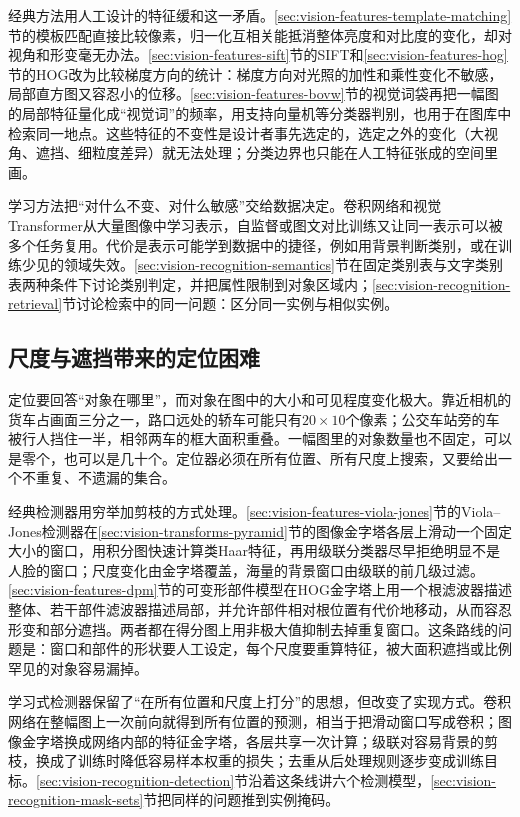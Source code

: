 经典方法用人工设计的特征缓和这一矛盾。\ref{sec:vision-features-template-matching}节的模板匹配直接比较像素，归一化互相关能抵消整体亮度和对比度的变化，却对视角和形变毫无办法。\ref{sec:vision-features-sift}节的SIFT和\ref{sec:vision-features-hog}节的HOG改为比较梯度方向的统计：梯度方向对光照的加性和乘性变化不敏感，局部直方图又容忍小的位移。\ref{sec:vision-features-bovw}节的视觉词袋再把一幅图的局部特征量化成“视觉词”的频率，用支持向量机等分类器判别，也用于在图库中检索同一地点。这些特征的不变性是设计者事先选定的，选定之外的变化（大视角、遮挡、细粒度差异）就无法处理；分类边界也只能在人工特征张成的空间里画。

学习方法把“对什么不变、对什么敏感”交给数据决定。卷积网络和视觉Transformer从大量图像中学习表示，自监督或图文对比训练又让同一表示可以被多个任务复用。代价是表示可能学到数据中的捷径，例如用背景判断类别，或在训练少见的领域失效。\ref{sec:vision-recognition-semantics}节在固定类别表与文字类别表两种条件下讨论类别判定，并把属性限制到对象区域内；\ref{sec:vision-recognition-retrieval}节讨论检索中的同一问题：区分同一实例与相似实例。

\subsection{尺度与遮挡带来的定位困难}
\label{sec:vision-recognition-challenge-localization}

定位要回答“对象在哪里”，而对象在图中的大小和可见程度变化极大。靠近相机的货车占画面三分之一，路口远处的轿车可能只有$20\times10$个像素；公交车站旁的车被行人挡住一半，相邻两车的框大面积重叠。一幅图里的对象数量也不固定，可以是零个，也可以是几十个。定位器必须在所有位置、所有尺度上搜索，又要给出一个不重复、不遗漏的集合。

经典检测器用穷举加剪枝的方式处理。\ref{sec:vision-features-viola-jones}节的Viola–Jones检测器在\ref{sec:vision-transforms-pyramid}节的图像金字塔各层上滑动一个固定大小的窗口，用积分图快速计算类Haar特征，再用级联分类器尽早拒绝明显不是人脸的窗口；尺度变化由金字塔覆盖，海量的背景窗口由级联的前几级过滤。\ref{sec:vision-features-dpm}节的可变形部件模型在HOG金字塔上用一个根滤波器描述整体、若干部件滤波器描述局部，并允许部件相对根位置有代价地移动，从而容忍形变和部分遮挡。两者都在得分图上用非极大值抑制去掉重复窗口。这条路线的问题是：窗口和部件的形状要人工设定，每个尺度要重算特征，被大面积遮挡或比例罕见的对象容易漏掉。

学习式检测器保留了“在所有位置和尺度上打分”的思想，但改变了实现方式。卷积网络在整幅图上一次前向就得到所有位置的预测，相当于把滑动窗口写成卷积；图像金字塔换成网络内部的特征金字塔，各层共享一次计算；级联对容易背景的剪枝，换成了训练时降低容易样本权重的损失；去重从后处理规则逐步变成训练目标。\ref{sec:vision-recognition-detection}节沿着这条线讲六个检测模型，\ref{sec:vision-recognition-mask-sets}节把同样的问题推到实例掩码。

